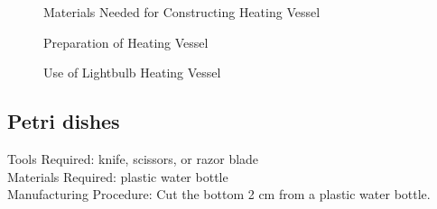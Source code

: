 \begin{figure}[h]
\begin{center}
\def\svgwidth{170pt}

\caption{Materials Needed for Constructing Heating Vessel}
\label{fig:heating vessel materials}
\end{center}
\end{figure}

\begin{figure}[h]
\begin{center}
\def\svgwidth{180pt}

\caption{Preparation of Heating Vessel}
\label{fig:heating vessel preparation}
\end{center}
\end{figure}

\begin{figure}[h!]
\begin{center}
\def\svgwidth{90pt}

\caption{Use of Lightbulb Heating Vessel}
\label{fig:heating vessel use}
\end{center}
\end{figure}

\subsection*{Petri dishes}
Tools Required: knife, scissors, or razor blade\\
Materials Required: plastic water bottle\\
Manufacturing Procedure: Cut the bottom 2 cm from a plastic water bottle.

